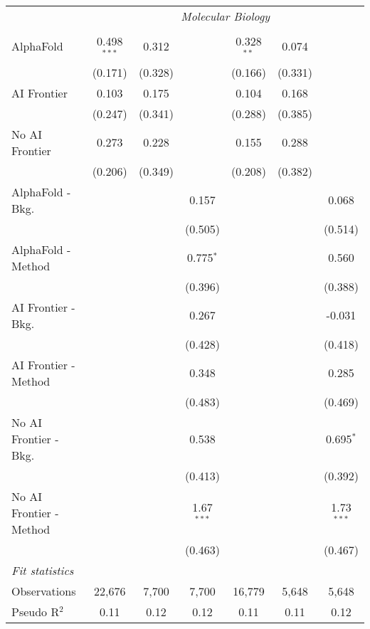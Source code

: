 \begin{tabular}{lcccccc}
 & \multicolumn{6}{c}{\textit{Molecular Biology}} \\ \\
   AlphaFold               & 0.498$^{***}$ & 0.312   &              & 0.328$^{**}$ & 0.074   &   \\   
                           & (0.171)       & (0.328) &              & (0.166)      & (0.331) &   \\   
   AI Frontier             & 0.103         & 0.175   &              & 0.104        & 0.168   &   \\   
                           & (0.247)       & (0.341) &              & (0.288)      & (0.385) &   \\   
   No AI Frontier          & 0.273         & 0.228   &              & 0.155        & 0.288   &   \\   
                           & (0.206)       & (0.349) &              & (0.208)      & (0.382) &   \\   
   AlphaFold - Bkg.        &               &         & 0.157        &              &         & 0.068\\   
                           &               &         & (0.505)      &              &         & (0.514)\\   
   AlphaFold - Method      &               &         & 0.775$^{*}$  &              &         & 0.560\\   
                           &               &         & (0.396)      &              &         & (0.388)\\   
   AI Frontier - Bkg.      &               &         & 0.267        &              &         & -0.031\\   
                           &               &         & (0.428)      &              &         & (0.418)\\   
   AI Frontier - Method    &               &         & 0.348        &              &         & 0.285\\   
                           &               &         & (0.483)      &              &         & (0.469)\\   
   No AI Frontier - Bkg.   &               &         & 0.538        &              &         & 0.695$^{*}$\\   
                           &               &         & (0.413)      &              &         & (0.392)\\   
   No AI Frontier - Method &               &         & 1.67$^{***}$ &              &         & 1.73$^{***}$\\   
                           &               &         & (0.463)      &              &         & (0.467)\\   
   \midrule
   \emph{Fit statistics}\\
   Observations            & 22,676        & 7,700   & 7,700        & 16,779       & 5,648   & 5,648\\  
   Pseudo R$^2$            & 0.11          & 0.12    & 0.12         & 0.11         & 0.11    & 0.12\\  
   

\end{tabular}
